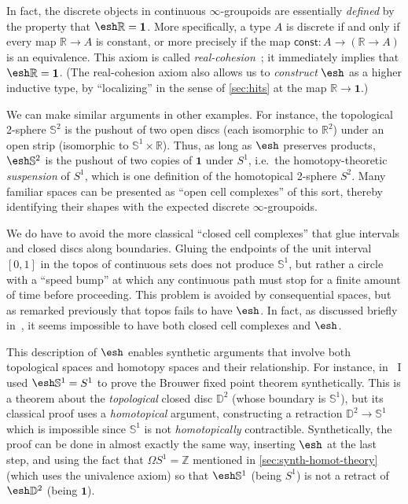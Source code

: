 \documentclass[10pt]{article}
\def\oo{\ensuremath{\infty}}
\def\Z{\mathbb{Z}}
\def\R{\mathbb{R}}
\def\hocirc{S^1}
\def\topcirc{\mathbb{S}^1}
\def\hosph{S^2}
\def\topsph{\mathbb{S}^2}
\def\topdisc{\mathbb{D}^2}
\def\unit{\mathbf{1}}
\numberwithin{equation}{section}
\newcommand{\shape}{\ensuremath{\mathord{\raisebox{0.5pt}{\text{\rm\esh}}}}}
\begin{document}
In fact, the discrete objects in continuous $\oo$-groupoids are essentially \emph{defined} by the property that $\shape\R=\unit$.
More specifically, a type $A$ is discrete if and only if every map $\R\to A$ is constant, or more precisely if the map $\mathsf{const}:A \to (\R\to A)$ is an equivalence.
This axiom is called \emph{real-cohesion}~\cite{shulman:bfp-realcohesion}; it immediately implies that $\shape \R=\unit$.
(The real-cohesion axiom also allows us to \emph{construct} $\shape$ as a higher inductive type, by ``localizing'' in the sense of \cref{sec:hits} at the map $\R\to \unit$.)

We can make similar arguments in other examples.
For instance, the topological 2-sphere $\topsph$ is the pushout of two open discs (each isomorphic to $\R^2$) under an open strip (isomorphic to $\topcirc \times \R$).
Thus, as long as $\shape$ preserves products, $\shape\topsph$ is the pushout of two copies of $\unit$ under $\hocirc$, i.e.\ the homotopy-theoretic \emph{suspension} of $\hocirc$, which is one definition of the homotopical 2-sphere $\hosph$.
Many familiar spaces can be presented as ``open cell complexes'' of this sort, thereby identifying their shapes with the expected discrete \oo-groupoids.

We do have to avoid the more classical ``closed cell complexes'' that glue intervals and closed discs along boundaries.
Gluing the endpoints of the unit interval $[0,1]$ in the topos of continuous sets does not produce $\topcirc$, but rather a circle with a ``speed bump'' at which any continuous path must stop for a finite amount of time before proceeding.
This problem is avoided by consequential spaces, but as remarked previously that topos fails to have $\shape$.
In fact, as discussed briefly in~\cite{ptj:topological-topos}, it seems impossible to have both closed cell complexes and $\shape$.

This description of $\shape$ enables synthetic arguments that involve both topological spaces and homotopy spaces and their relationship.
For instance, in~\cite{shulman:bfp-realcohesion} I used $\shape\topcirc = \hocirc$ to prove the Brouwer fixed point theorem synthetically.
This is a theorem about the \emph{topological} closed disc $\topdisc$ (whose boundary is $\topcirc$), but its classical proof uses a \emph{homotopical} argument, constructing a retraction $\topdisc \to \topcirc$ which is impossible since $\topcirc$ is not \emph{homotopically} contractible.
Synthetically, the proof can be done in almost exactly the same way, inserting $\shape$ at the last step, and using the fact that $\Omega\hocirc = \Z$ mentioned in \cref{sec:synth-homot-theory} (which uses the univalence axiom) so that $\shape\topcirc$ (being $\hocirc$) is not a retract of $\shape \topdisc$ (being $\unit$).
\end{document}
